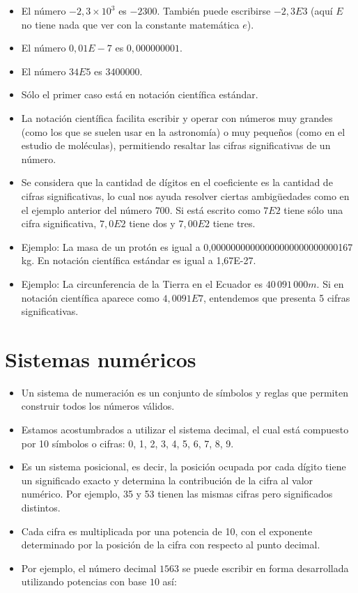 \documentclass[openany]{book}
\providecommand{\tightlist}{%
  \setlength{\itemsep}{0pt}\setlength{\parskip}{0pt}}
\begin{document}
\begin{itemize}
\item
  El número \(-2,3 \times 10^3\) es \(-2300\). También puede escribirse \(-2,3E3\) (aquí \(E\) no tiene nada que ver con la constante matemática \(e\)).
\item
  El número \(0,01E-7\) es \(0,000000001\).
\item
  El número \(34E5\) es \(3400000\).
\item
  Sólo el primer caso está en notación científica estándar.
\item
  La notación científica facilita escribir y operar con números muy grandes (como los que se suelen usar en la astronomía) o muy pequeños (como en el estudio de moléculas), permitiendo resaltar las cifras significativas de un número.
\item
  Se considera que la cantidad de dígitos en el coeficiente es la cantidad de cifras significativas, lo cual nos ayuda resolver ciertas ambigüedades como en el ejemplo anterior del número \(700\). Si está escrito como \(7E2\) tiene sólo una cifra significativa, \(7,0E2\) tiene dos y \(7,00E2\) tiene tres.
\item
  Ejemplo: La masa de un protón es igual a 0,00000000000000000000000000167 kg. En notación científica estándar es igual a 1,67E-27.
\item
  Ejemplo: La circunferencia de la Tierra en el Ecuador es \(40 \, 091 \, 000 m\). Si en notación científica aparece como \(4,0091E7\), entendemos que presenta 5 cifras significativas.
\end{itemize}

\hypertarget{sistemas-numuxe9ricos}{%
\section{Sistemas numéricos}\label{sistemas-numuxe9ricos}}

\begin{itemize}
\tightlist
\item
  Un sistema de numeración es un conjunto de símbolos y reglas que permiten construir todos los números válidos.
\item
  Estamos acostumbrados a utilizar el sistema decimal, el cual está compuesto por 10 símbolos o cifras: 0, 1, 2, 3, 4, 5, 6, 7, 8, 9.
\item
  Es un sistema posicional, es decir, la posición ocupada por cada dígito tiene un significado exacto y determina la contribución de la cifra al valor numérico. Por ejemplo, 35 y 53 tienen las mismas cifras pero significados distintos.
\item
  Cada cifra es multiplicada por una potencia de 10, con el exponente determinado por la posición de la cifra con respecto al punto decimal.
\item
  Por ejemplo, el número decimal \(1563\) se puede escribir en forma desarrollada utilizando potencias con base \(10\) así:
\end{itemize}
\end{document}
